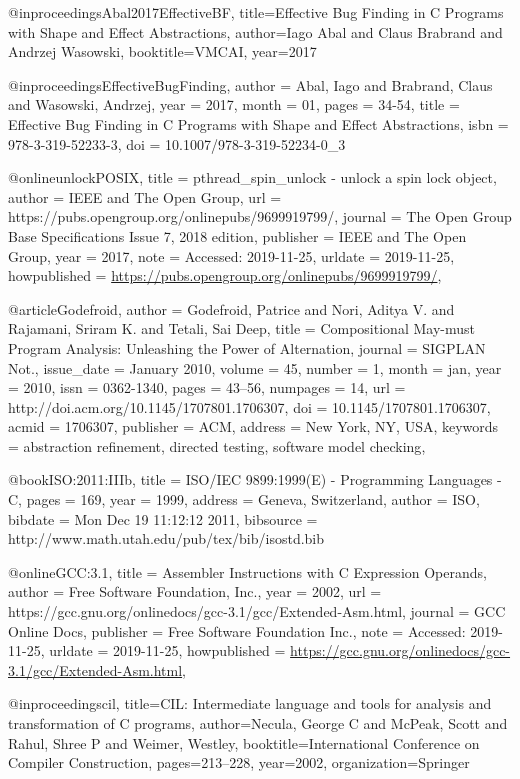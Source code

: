 @inproceedings{Abal2017EffectiveBF,
  title={Effective Bug Finding in C Programs with Shape and Effect Abstractions},
  author={Iago Abal and Claus Brabrand and Andrzej Wasowski},
  booktitle={VMCAI},
  year={2017}
}

@inproceedings{EffectiveBugFinding,
author = {Abal, Iago and Brabrand, Claus and Wasowski, Andrzej},
year = {2017},
month = {01},
pages = {34-54},
title = {Effective Bug Finding in C Programs with Shape and Effect Abstractions},
isbn = {978-3-319-52233-3},
doi = {10.1007/978-3-319-52234-0_3}
}

@online{unlockPOSIX, 
title = {pthread\_spin\_unlock - unlock a spin lock object}, 
author = {IEEE and The Open Group},
url = {https://pubs.opengroup.org/onlinepubs/9699919799/}, 
journal = {The Open Group Base Specifications Issue 7, 2018 edition}, 
publisher = {IEEE and The Open Group}, 
year = 2017,
note = {Accessed: 2019-11-25},
urldate = {2019-11-25},
howpublished = {\url{https://pubs.opengroup.org/onlinepubs/9699919799/}},
}

@article{Godefroid,
 author = {Godefroid, Patrice and Nori, Aditya V. and Rajamani, Sriram K. and Tetali, Sai Deep},
 title = {Compositional May-must Program Analysis: Unleashing the Power of Alternation},
 journal = {SIGPLAN Not.},
 issue_date = {January 2010},
 volume = {45},
 number = {1},
 month = jan,
 year = {2010},
 issn = {0362-1340},
 pages = {43--56},
 numpages = {14},
 url = {http://doi.acm.org/10.1145/1707801.1706307},
 doi = {10.1145/1707801.1706307},
 acmid = {1706307},
 publisher = {ACM},
 address = {New York, NY, USA},
 keywords = {abstraction refinement, directed testing, software model checking},
} 

@book{ISO:2011:IIIb,
  title = {ISO/IEC 9899:1999(E) - Programming Languages - C},
  pages = {169},
  year = {1999},
  address = {Geneva, Switzerland},
  author = {ISO},
  bibdate = {Mon Dec 19 11:12:12 2011},
  bibsource = {http://www.math.utah.edu/pub/tex/bib/isostd.bib}
}

@online{GCC:3.1, 
title = {Assembler Instructions with C Expression Operands}, 
author = {Free Software Foundation, Inc.},
year = 2002,
url = {https://gcc.gnu.org/onlinedocs/gcc-3.1/gcc/Extended-Asm.html}, 
journal = {GCC Online Docs}, 
publisher = {Free Software Foundation Inc.}, 
note = {Accessed: 2019-11-25},
urldate = {2019-11-25},
howpublished = {\url{https://gcc.gnu.org/onlinedocs/gcc-3.1/gcc/Extended-Asm.html}},
}

@inproceedings{cil,
  title={CIL: Intermediate language and tools for analysis and transformation of C programs},
  author={Necula, George C and McPeak, Scott and Rahul, Shree P and Weimer, Westley},
  booktitle={International Conference on Compiler Construction},
  pages={213--228},
  year={2002},
  organization={Springer}
}


